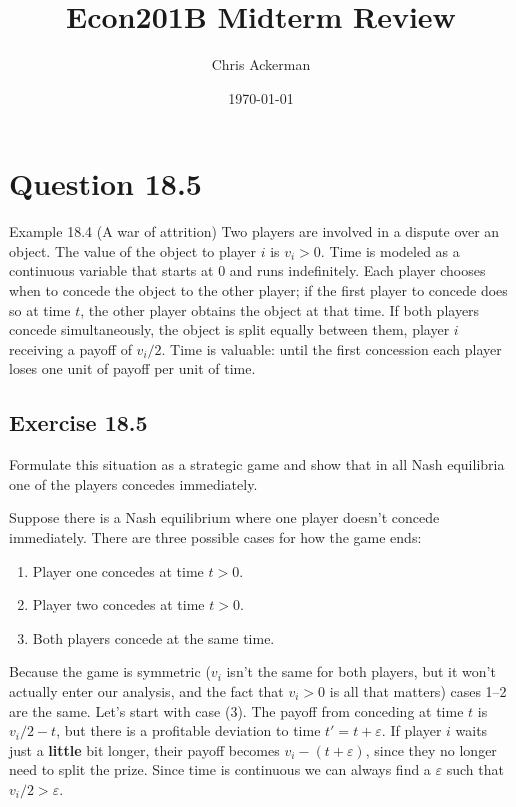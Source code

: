 \documentclass[11pt]{article}
\author{Chris Ackerman}
\date{\today}
\title{Econ201B Midterm Review}
\begin{document}
\maketitle
\tableofcontents

\newpage

\section{Question 18.5}
\label{sec:org111fe3a}
Example 18.4 (A war of attrition) Two players are involved in a dispute over an object. The value of the object to player \(i\) is \(v_i > 0\). Time
is modeled as a continuous variable that starts at \(0\) and runs indefinitely.
Each player chooses when to concede the object to the other player; if
the first player to concede does so at time \(t\), the other player obtains the
object at that time. If both players concede simultaneously, the object
is split equally between them, player \(i\) receiving a payoff of \(v_i/2\). Time
is valuable: until the first concession each player loses one unit of payoff
per unit of time.

\subsection{Exercise 18.5}
\label{sec:org7783676}
Formulate this situation as a strategic game and show
that in all Nash equilibria one of the players concedes immediately.


Suppose there is a Nash equilibrium where one player doesn't concede immediately. There are three possible cases for how the game ends:

\begin{enumerate}
\item Player one concedes at time $t > 0$.
\item Player two concedes at time $t > 0$.
\item Both players concede at the same time.
\end{enumerate}

Because the game is symmetric (\(v_i\) isn't the same for both players, but it won't actually enter our analysis, and the fact that \(v_i > 0\) is all that matters) cases 1--2 are the same. Let's start with case (3). The payoff from conceding at time \(t\) is \(v_i/2 - t\), but there is a profitable deviation to time \(t' = t + \varepsilon\). If player \(i\) waits just a \textbf{little} bit longer, their payoff becomes \(v_i - (t + \varepsilon)\), since they no longer need to split the prize. Since time is continuous we can always find a \(\varepsilon\) such that \(v_i/2 > \varepsilon\).
\end{document}
